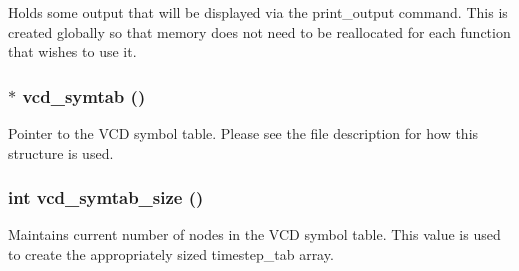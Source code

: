 Holds some output that will be displayed via the print\_\-output command. This is created globally so that memory does not need to be reallocated for each function that wishes to use it. 
\subsubsection{$\ast$ {\bf vcd\_\-symtab} ()}\label{vcd_8c_a3}


Pointer to the VCD symbol table. Please see the file description for how this structure is used. 
\subsubsection{\setlength{\rightskip}{0pt plus 5cm}int {\bf vcd\_\-symtab\_\-size} ()}\label{vcd_8c_a4}


Maintains current number of nodes in the VCD symbol table. This value is used to create the appropriately sized timestep\_\-tab array. 